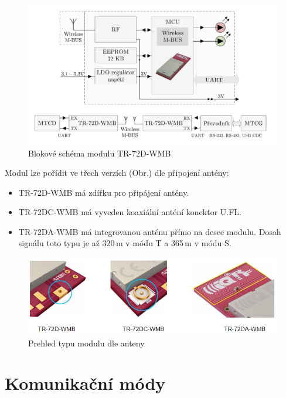 \newpage

 \begin{figure}[!h]
  \begin{center}
    \includegraphics[scale=0.8]{obrazky/modul_block}
  \end{center}
  \caption{Blokové schéma modulu TR-72D-WMB \cite{iqrfmodul}}
	\label{BlokovkaIQRF}
\end{figure}

Modul lze pořídit ve třech verzích (Obr.\label{ObrazekAnteny}) dle připojení antény:
\begin{itemize}
		\item TR-72D-WMB má zdířku pro připájení antény.
		\item TR-72DC-WMB	má vyveden koaxiální anténí konektor U.FL. 
		\item TR-72DA-WMB má integrovanou anténu přímo na desce modulu. Dosah signálu toto typu je až 320\,m v módu T a 365\,m v módu S.
\end{itemize}
 \begin{figure}[!h]
  \begin{center}
    \includegraphics[scale=0.7]{obrazky/modul_antena}
  \end{center}
  \caption{Prehled typu modulu dle anteny \cite{iqrfmodul}}
	\label{ObrazekAnteny}
\end{figure}

\section{Komunikační módy}

